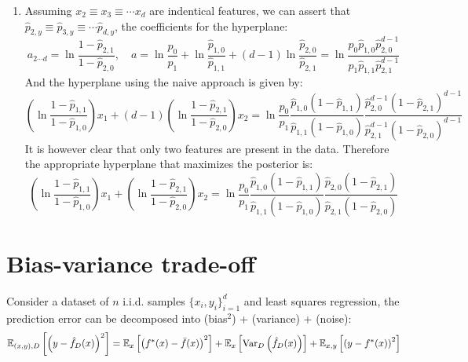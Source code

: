 \documentclass[a4paper, 10pt]{article}
\begin{document}
\begin{enumerate}[label=(\alph*)]
    \item Assuming $x_2\equiv x_3 \equiv \cdots x_d$ are indentical features, we can assert that $\hat{p}_{2,y} \equiv \hat{p}_{3,y} \equiv \cdots \hat{p}_{d,y}$, the coefficients for the hyperplane:
    \begin{equation}
        a_{2\cdots d} = \ln \frac{1 - \hat{p}_{2,1}}{1 - \hat{p}_{2, 0}}, \quad a = \ln \frac{p_0}{p_1} + \ln \frac{\hat{p}_{1,0}}{\hat{p}_{1,1}} + (d - 1) \ln \frac{\hat{p}_{2,0}}{\hat{p}_{2,1}} = \ln \frac{p_0 \hat{p}_{1,0} \hat{p}_{2,0}^{d-1}}{p_1 \hat{p}_{1,1} \hat{p}_{2,1}^{d-1}}
    \end{equation}
    And the hyperplane using the naive approach is given by:
    \begin{equation}
        \left(\ln \frac{1 - \hat{p}_{1,1}}{1 - \hat{p}_{1,0}}\right) x_1 + (d - 1)\left(\ln \frac{1 - \hat{p}_{2,1}}{1 - \hat{p}_{2,0}}\right) x_2 = \ln \frac{p_0}{p_1} \frac{\hat{p}_{1,0} (1 - \hat{p}_{1,1})}{\hat{p}_{1,1} (1 - \hat{p}_{1,0})} \frac{\hat{p}_{2,0}^{d-1}(1 - \hat{p}_{2,1})^{d-1}}{\hat{p}_{2,1}^{d-1}(1 - \hat{p}_{2,0})^{d-1}}
    \end{equation}
    It is however clear that only two features are present in the data. Therefore the appropriate hyperplane that maximizes the posterior is:
    \begin{equation}
        \left(\ln \frac{1 - \hat{p}_{1,1}}{1 - \hat{p}_{1,0}}\right) x_1 + \left(\ln \frac{1 - \hat{p}_{2,1}}{1 - \hat{p}_{2,0}}\right) x_2 = \ln \frac{p_0}{p_1} \frac{\hat{p}_{1,0} (1 - \hat{p}_{1,1})}{\hat{p}_{1,1} (1 - \hat{p}_{1,0})} \frac{\hat{p}_{2,0}(1 - \hat{p}_{2,1})}{\hat{p}_{2,1}(1 - \hat{p}_{2,0})}
    \end{equation}
\end{enumerate}

\section{Bias-variance trade-off}

Consider a dataset of $n$ i.i.d. samples $\{x_i, y_i\}_{i=1}^d$ and least squares regression, the prediction error can be decomposed into (bias$^2$) + (variance) + (noise):
\begin{equation}
    \mathbb{E}_{(x,y),D} \left[\left(y - \hat{f}_D(x)\right)^2\right] = \mathbb{E}_x \left[\left(f^*(x) - \bar{f}(x)\right)^2\right] + \mathbb{E}_x \left[{\rm Var}_D \left(\hat{f}_D(x)\right)\right] + \mathbb{E}_{x,y} \left[\left(y - f^*(x)\right)^2\right]
\end{equation}
\end{document}
